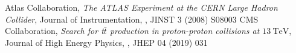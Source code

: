 \begin{thebibliography}{99}
 Atlas Collaboration, \textit{The {ATLAS} Experiment at the {CERN} Large Hadron Collider}, Journal of Instrumentation, , JINST 3 (2008) S08003
 CMS Collaboration, \textit{Search for t$\bar{t}$ production in proton-proton collisions at $\SI{13}{\tera\electronvolt}$}, Journal of High Energy Physics, , JHEP 04 (2019) 031
\end{thebibliography}